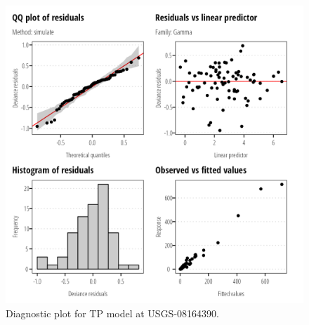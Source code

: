 \documentclass[
]{article}
\begin{document}
\clearpage

\begin{figure}[h]

{\centering \includegraphics{model_assessment_files/figure-pdf/unnamed-chunk-22-1.png}

}

\caption{Diagnostic plot for TP model at USGS-08164390.}

\end{figure}
\end{document}
